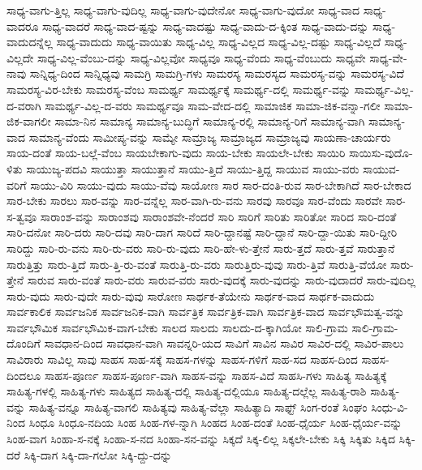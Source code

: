 {ಸಾಧ್ಯ-ವಾಗು-ತ್ತಿಲ್ಲ
ಸಾಧ್ಯ-ವಾಗು-ವುದಿಲ್ಲ
ಸಾಧ್ಯ-ವಾಗು-ವುದೇನೋ
ಸಾಧ್ಯ-ವಾಗು-ವುದೋ
ಸಾಧ್ಯ-ವಾದ
ಸಾಧ್ಯ-ವಾದರೂ
ಸಾಧ್ಯ-ವಾದರೆ
ಸಾಧ್ಯ-ವಾದ-ಷ್ಟನ್ನು
ಸಾಧ್ಯ-ವಾದಷ್ಟು
ಸಾಧ್ಯ-ವಾದು-ದ-ಕ್ಕಿಂತ
ಸಾಧ್ಯ-ವಾದು-ದನ್ನು
ಸಾಧ್ಯ-ವಾದುದನ್ನೆಲ್ಲ
ಸಾಧ್ಯ-ವಾದುದು
ಸಾಧ್ಯ-ವಾಯಿತು
ಸಾಧ್ಯ-ವಿಲ್ಲ
ಸಾಧ್ಯ-ವಿಲ್ಲದ
ಸಾಧ್ಯ-ವಿಲ್ಲ-ದಷ್ಟು
ಸಾಧ್ಯ-ವಿಲ್ಲದೆ
ಸಾಧ್ಯ-ವಿಲ್ಲದೇ
ಸಾಧ್ಯ-ವಿಲ್ಲ-ವೆಂಬು-ದನ್ನು
ಸಾಧ್ಯ-ವಿಲ್ಲವೋ
ಸಾಧ್ಯವೂ
ಸಾಧ್ಯ-ವೆಂದು
ಸಾಧ್ಯ-ವೆಂಬುದು
ಸಾಧ್ಯವೇ
ಸಾಧ್ಯ-ವೇ-ನಾವು
ಸಾನ್ನಿಧ್ಯ-ದಿಂದ
ಸಾನ್ನಿಧ್ಯವು
ಸಾಮಗ್ರಿ
ಸಾಮಗ್ರಿ-ಗಳು
ಸಾಮರಸ್ಯ
ಸಾಮರಸ್ಯದ
ಸಾಮರಸ್ಯ-ವನ್ನು
ಸಾಮರಸ್ಯ-ವಿದೆ
ಸಾಮರಸ್ಯ-ವಿರ-ಬೇಕು
ಸಾಮರಸ್ಯ-ವೆಂಬ
ಸಾಮರ್ಥ್ಯ
ಸಾಮರ್ಥ್ಯಕ್ಕೆ
ಸಾಮರ್ಥ್ಯ-ದಲ್ಲಿ
ಸಾಮರ್ಥ್ಯ-ವನ್ನು
ಸಾಮರ್ಥ್ಯ-ವಿಲ್ಲ-ದ-ವರಾಗಿ
ಸಾಮರ್ಥ್ಯ-ವಿಲ್ಲ-ದ-ವರು
ಸಾಮರ್ಥ್ಯವೂ
ಸಾಮ-ವೇದ-ದಲ್ಲಿ
ಸಾಮಾಜಿಕ
ಸಾಮಾ-ಜಿಕ-ವನ್ನಾ-ಗಲೀ
ಸಾಮಾ-ಜಿಕ-ವಾಗಲೀ
ಸಾಮಾ-ನಿನ
ಸಾಮಾನ್ಯ
ಸಾಮಾನ್ಯ-ಬುದ್ಧಿಗೆ
ಸಾಮಾನ್ಯ-ರಲ್ಲಿ
ಸಾಮಾನ್ಯ-ರಿಗೆ
ಸಾಮಾನ್ಯ-ವಾಗಿ
ಸಾಮಾನ್ಯ-ವಾದ
ಸಾಮಾನ್ಯ-ವೆಂದು
ಸಾಮೀಪ್ಯ-ವನ್ನು
ಸಾಮ್ಯೇ
ಸಾಮ್ರಾಜ್ಯ
ಸಾಮ್ರಾಜ್ಯದ
ಸಾಮ್ರಾಜ್ಯವು
ಸಾಯಣಾ-ಚಾರ್ಯರು
ಸಾಯ-ದಂತೆ
ಸಾಯ-ಬಲ್ಲೆ-ವೆಂಬ
ಸಾಯಬೇಕಾಗು-ವುದು
ಸಾಯ-ಬೇಕು
ಸಾಯಲೇ-ಬೇಕು
ಸಾಯಿರಿ
ಸಾಯಿಸು-ವುದೊ-ಳಿತು
ಸಾಯುಜ್ಯ-ಪದವಿ
ಸಾಯುತ್ತಾ
ಸಾಯುತ್ತಾನೆ
ಸಾಯು-ತ್ತಿದೆ
ಸಾಯು-ತ್ತಿದ್ದ
ಸಾಯುವ
ಸಾಯು-ವರು
ಸಾಯುವ-ವರಿಗೆ
ಸಾಯು-ವಿರಿ
ಸಾಯು-ವುದು
ಸಾಯು-ವೆವು
ಸಾಯೋಣ
ಸಾರ
ಸಾರ-ದಂತಿ-ರುವ
ಸಾರ-ಬೇಕಾಗಿದೆ
ಸಾರ-ಬೇಕಾದ
ಸಾರ-ಬೇಕು
ಸಾರಲು
ಸಾರ-ವನ್ನು
ಸಾರ-ವನ್ನೆಲ್ಲ
ಸಾರ-ವಾಗಿ-ರು-ವನು
ಸಾರವು
ಸಾರವೂ
ಸಾರ-ವೆಂದು
ಸಾರವೇ
ಸಾರ-ಸ-ತ್ವವೂ
ಸಾರಾಂಶ-ವನ್ನು
ಸಾರಾಂಶವು
ಸಾರಾಂಶವೇ-ನೆಂದರೆ
ಸಾರಿ
ಸಾರಿಗೆ
ಸಾರಿತು
ಸಾರಿತೋ
ಸಾರಿದ
ಸಾರಿ-ದಂತೆ
ಸಾರಿ-ದನೋ
ಸಾರಿ-ದರು
ಸಾರಿ-ದವು
ಸಾರಿ-ದಾಗ
ಸಾರಿದೆ
ಸಾರಿ-ದ್ದಾನಷ್ಟೆ
ಸಾರಿ-ದ್ದಾನೆ
ಸಾರಿ-ದ್ದಾ-ಯಿತು
ಸಾರಿ-ದ್ದೀರಿ
ಸಾರಿದ್ದು
ಸಾರಿ-ರು-ವನು
ಸಾರಿ-ರು-ವರು
ಸಾರಿ-ರು-ವುದು
ಸಾರಿ-ಹೇ-ಳು-ತ್ತೇನೆ
ಸಾರು-ತ್ತದೆ
ಸಾರು-ತ್ತವೆ
ಸಾರುತ್ತಾನೆ
ಸಾರುತ್ತಿತ್ತು
ಸಾರು-ತ್ತಿದೆ
ಸಾರು-ತ್ತಿ-ರು-ವಂತೆ
ಸಾರುತ್ತಿ-ರು-ವರು
ಸಾರುತ್ತಿರು-ವುವು
ಸಾರು-ತ್ತಿವೆ
ಸಾರುತ್ತಿ-ವೆಯೋ
ಸಾರು-ತ್ತೇನೆ
ಸಾರುವ
ಸಾರು-ವಂತೆ
ಸಾರು-ವರು
ಸಾರುವ-ವರು
ಸಾರು-ವುದಕ್ಕೆ
ಸಾರು-ವುದನ್ನು
ಸಾರು-ವುದಾದರೆ
ಸಾರು-ವುದಿಲ್ಲ
ಸಾರು-ವುದು
ಸಾರು-ವುದೇ
ಸಾರು-ವುವು
ಸಾರೋಣ
ಸಾರ್ಥಕ-ತೆಯೇನು
ಸಾರ್ಥಕ-ವಾದ
ಸಾರ್ಥಕ-ವಾದುದು
ಸಾರ್ವಕಾಲಿಕ
ಸಾರ್ವಜನಿಕ
ಸಾರ್ವಜನಿಕ-ವಾಗಿ
ಸಾರ್ವತ್ರಿಕ
ಸಾರ್ವತ್ರಿಕ-ವಾಗಿ
ಸಾರ್ವತ್ರಿಕ-ವಾದ
ಸಾರ್ವಭೌಮತ್ವ-ವನ್ನು
ಸಾರ್ವಭೌಮಿಕ
ಸಾರ್ವಭೌಮಿಕ-ವಾಗ-ಬೇಕು
ಸಾಲದ
ಸಾಲದು
ಸಾಲದು-ದ-ಕ್ಕಾಗಿಯೋ
ಸಾಲಿ-ಗ್ರಾಮ
ಸಾಲಿ-ಗ್ರಾಮ-ದೊಂದಿಗೆ
ಸಾವಧಾನ-ದಿಂದ
ಸಾವಧಾನ-ವಾಗಿ
ಸಾವನ್ನರಿ-ಯದ
ಸಾವಿಗೆ
ಸಾವಿನ
ಸಾವಿರ
ಸಾವಿರ-ದಲ್ಲಿ
ಸಾವಿರ-ಪಾಲು
ಸಾವಿರಾರು
ಸಾವಿಲ್ಲ
ಸಾವು
ಸಾಹಸ
ಸಾಹ-ಸಕ್ಕೆ
ಸಾಹಸ-ಗಳನ್ನು
ಸಾಹಸ-ಗಳಿಗೆ
ಸಾಹ-ಸದ
ಸಾಹಸ-ದಿಂದ
ಸಾಹಸ-ದಿಂದಲೂ
ಸಾಹಸ-ಪೂರ್ಣ
ಸಾಹಸ-ಪೂರ್ಣ-ವಾಗಿ
ಸಾಹಸ-ವನ್ನು
ಸಾಹಸ-ವಿದೆ
ಸಾಹಸಿ-ಗಳು
ಸಾಹಿತ್ಯ
ಸಾಹಿತ್ಯಕ್ಕೆ
ಸಾಹಿತ್ಯ-ಗಳಲ್ಲಿ
ಸಾಹಿತ್ಯ-ಗಳು
ಸಾಹಿತ್ಯದ
ಸಾಹಿತ್ಯ-ದಲ್ಲಿ
ಸಾಹಿತ್ಯ-ದಲ್ಲಿಯೂ
ಸಾಹಿತ್ಯ-ದಲ್ಲೆಲ್ಲ
ಸಾಹಿತ್ಯ-ರಾಶಿ
ಸಾಹಿತ್ಯ-ವನ್ನು
ಸಾಹಿತ್ಯ-ವನ್ನೂ
ಸಾಹಿತ್ಯ-ವಾಗಲಿ
ಸಾಹಿತ್ಯವು
ಸಾಹಿತ್ಯ-ವೆಲ್ಲಾ
ಸಾಹಿತ್ಯಾದಿ
ಸಾಫ್ಟ್
ಸಿಂಗ-ರಂತೆ
ಸಿಂಘಂ
ಸಿಂಧು-ವಿ-ನಿಂದ
ಸಿಂಧೂ
ಸಿಂಧೂ-ನದಿಯ
ಸಿಂಹ
ಸಿಂಹ-ಗಳ-ನ್ನಾಗಿ
ಸಿಂಹದ
ಸಿಂಹ-ದಂತೆ
ಸಿಂಹ-ಧೈರ್ಯ
ಸಿಂಹ-ಧೈರ್ಯ-ವನ್ನು
ಸಿಂಹ-ವಾಗ
ಸಿಂಹಾ-ಸ-ನಕ್ಕೆ
ಸಿಂಹಾ-ಸ-ನದ
ಸಿಂಹಾ-ಸನ-ವನ್ನು
ಸಿಕ್ಕದೆ
ಸಿಕ್ಕ-ಲಿಲ್ಲ
ಸಿಕ್ಕಲೇ-ಬೇಕು
ಸಿಕ್ಕಿ
ಸಿಕ್ಕಿತು
ಸಿಕ್ಕಿದ
ಸಿಕ್ಕಿ-ದರೆ
ಸಿಕ್ಕಿ-ದಾಗ
ಸಿಕ್ಕಿ-ದಾ-ಗಲೋ
ಸಿಕ್ಕಿ-ದ್ದು-ದನ್ನು
}
